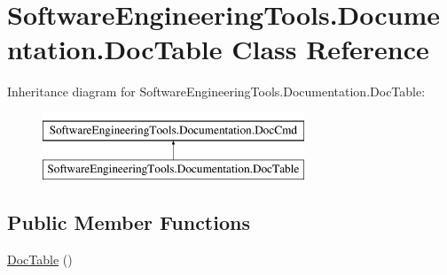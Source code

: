 \hypertarget{class_software_engineering_tools_1_1_documentation_1_1_doc_table}{\section{Software\+Engineering\+Tools.\+Documentation.\+Doc\+Table Class Reference}
\label{class_software_engineering_tools_1_1_documentation_1_1_doc_table}
}
Inheritance diagram for Software\+Engineering\+Tools.\+Documentation.\+Doc\+Table\+:\begin{figure}[H]
\begin{center}
\leavevmode
\includegraphics[height=2.000000cm]{class_software_engineering_tools_1_1_documentation_1_1_doc_table}
\end{center}
\end{figure}
\subsection*{Public Member Functions}
\begin{DoxyCompactItemize}
\item 
\hyperlink{class_software_engineering_tools_1_1_documentation_1_1_doc_table_a834a37e8969331cf2b37a442724b47c8}{Doc\+Table} ()
\end{DoxyCompactItemize}
